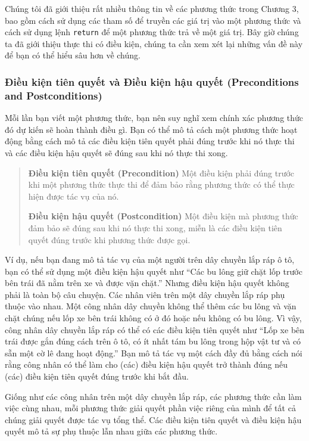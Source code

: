 Chúng tôi đã giới thiệu rất nhiều thông tin về các phương thức trong
Chương 3, bao gồm cách sử dụng các tham số để truyền các giá trị vào một
phương thức và cách sử dụng lệnh \texttt{return} để một phương thức trả
về một giá trị. Bây giờ chúng ta đã giới thiệu thực thi có điều kiện,
chúng ta cần xem xét lại những vấn đề này để bạn có thể hiểu sâu hơn về
chúng.

\subsubsection{Điều kiện tiên quyết và Điều kiện hậu quyết
(Preconditions and
Postconditions)}\label{ux111iux1ec1u-kiux1ec7n-tiuxean-quyux1ebft-vuxe0-ux111iux1ec1u-kiux1ec7n-hux1eadu-quyux1ebft-preconditions-and-postconditions}

Mỗi lần bạn viết một phương thức, bạn nên suy nghĩ xem chính xác phương
thức đó dự kiến sẽ hoàn thành điều gì. Bạn có thể mô tả cách một phương
thức hoạt động bằng cách mô tả các điều kiện tiên quyết phải đúng trước
khi nó thực thi và các điều kiện hậu quyết sẽ đúng sau khi nó thực thi
xong.

\begin{quote}
\textbf{Điều kiện tiên quyết (Precondition)} Một điều kiện phải đúng
trước khi một phương thức thực thi để đảm bảo rằng phương thức có thể
thực hiện được tác vụ của nó.

\textbf{Điều kiện hậu quyết (Postcondition)} Một điều kiện mà phương
thức đảm bảo sẽ đúng sau khi nó thực thi xong, miễn là các điều kiện
tiên quyết đúng trước khi phương thức được gọi.
\end{quote}

Ví dụ, nếu bạn đang mô tả tác vụ của một người trên dây chuyền lắp ráp ô
tô, bạn có thể sử dụng một điều kiện hậu quyết như ``Các bu lông giữ
chặt lốp trước bên trái đã nằm trên xe và được vặn chặt.'' Nhưng điều
kiện hậu quyết không phải là toàn bộ câu chuyện. Các nhân viên trên một
dây chuyền lắp ráp phụ thuộc vào nhau. Một công nhân dây chuyền không
thể thêm các bu lông và vặn chặt chúng nếu lốp xe bên trái không có ở đó
hoặc nếu không có bu lông. Vì vậy, công nhân dây chuyền lắp ráp có thể
có các điều kiện tiên quyết như ``Lốp xe bên trái được gắn đúng cách
trên ô tô, có ít nhất tám bu lông trong hộp vật tư và có sẵn một cờ lê
đang hoạt động.'' Bạn mô tả tác vụ một cách đầy đủ bằng cách nói rằng
công nhân có thể làm cho (các) điều kiện hậu quyết trở thành đúng nếu
(các) điều kiện tiên quyết đúng trước khi bắt đầu.

Giống như các công nhân trên một dây chuyền lắp ráp, các phương thức cần
làm việc cùng nhau, mỗi phương thức giải quyết phần việc riêng của mình
để tất cả chúng giải quyết được tác vụ tổng thể. Các điều kiện tiên
quyết và điều kiện hậu quyết mô tả sự phụ thuộc lẫn nhau giữa các phương
thức.

